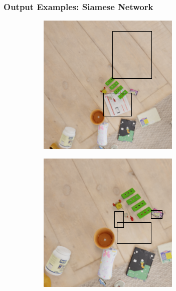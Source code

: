 \documentclass[13.5pt,aspecratio=169, xcolor=dvipsnames]{beamer}
\begin{document}
\begin{frame}
    \end{frame}


\begin{frame}
    \onehalfspacing
        \frametitle{Output Examples: Siamese Network}    
        \begin{figure}
            \begin{subfigure}{0.5\textwidth}
              \centering
              \includegraphics[width=\linewidth]{Example/Output/SM_1.png}
              \captionsetup{labelformat=empty}
            \end{subfigure}%
            \begin{subfigure}{0.5\textwidth}
              \centering
              \includegraphics[width=\linewidth]{Example/Output/SM_1_2.png}

\end{subfigure}
\end{figure}
\end{frame}
\end{document}
